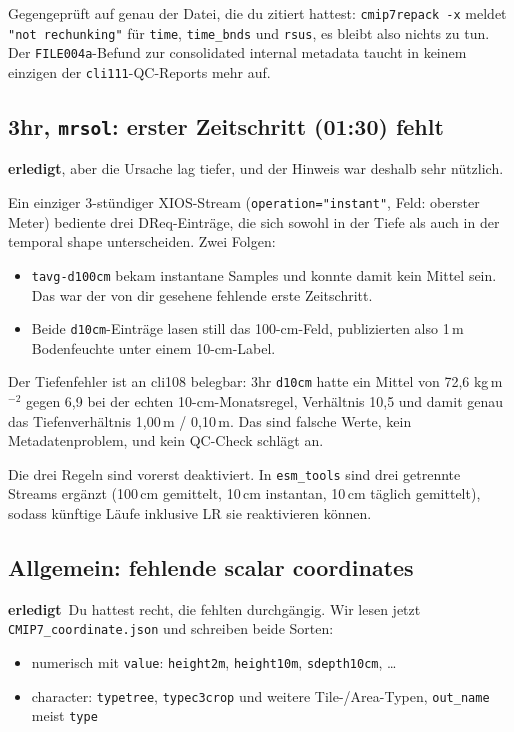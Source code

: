 \documentclass[11pt,a4paper]{article}
\newcommand{\code}[1]{\texttt{\small #1}}
\newcommand{\ok}{\textcolor{green!45!black}{\textbf{erledigt}}}
\begin{document}
Gegengepr\"uft auf genau der Datei, die du zitiert hattest:
\code{cmip7repack -x} meldet \code{"not rechunking"} f\"ur \code{time},
\code{time\_bnds} und \code{rsus}, es bleibt also nichts zu tun. Der
\code{FILE004a}-Befund zur consolidated internal metadata taucht in keinem
einzigen der \code{cli111}-QC-Reports mehr auf.

\subsection*{3hr, \code{mrsol}: erster Zeitschritt (01:30) fehlt}
\ok, aber die Ursache lag tiefer, und der Hinweis war deshalb sehr n\"utzlich.

Ein einziger 3-st\"undiger XIOS-Stream (\code{operation="instant"}, Feld: oberster
Meter) bediente drei DReq-Eintr\"age, die sich sowohl in der Tiefe als auch in der
temporal shape unterscheiden. Zwei Folgen:

\begin{itemize}
\item \code{tavg-d100cm} bekam instantane Samples und konnte damit kein Mittel sein.
      Das war der von dir gesehene fehlende erste Zeitschritt.
\item Beide \code{d10cm}-Eintr\"age lasen still das 100-cm-Feld, publizierten also
      1\,m Bodenfeuchte unter einem 10-cm-Label.
\end{itemize}

Der Tiefenfehler ist an cli108 belegbar: 3hr \code{d10cm} hatte ein Mittel von
72{,}6 kg\,m$^{-2}$ gegen 6{,}9 bei der echten 10-cm-Monatsregel, Verh\"altnis
10{,}5 und damit genau das Tiefenverh\"altnis 1{,}00\,m / 0{,}10\,m. Das sind falsche
Werte, kein Metadatenproblem, und kein QC-Check schl\"agt an.

Die drei Regeln sind vorerst deaktiviert. In \code{esm\_tools} sind drei getrennte
Streams erg\"anzt (100\,cm gemittelt, 10\,cm instantan, 10\,cm t\"aglich gemittelt),
sodass k\"unftige L\"aufe inklusive LR sie reaktivieren k\"onnen.

\subsection*{Allgemein: fehlende scalar coordinates}
\ok\ Du hattest recht, die fehlten durchg\"angig. Wir lesen jetzt
\code{CMIP7\_coordinate.json} und schreiben beide Sorten:

\begin{itemize}
\item numerisch mit \code{value}: \code{height2m}, \code{height10m}, \code{sdepth10cm}, \dots
\item character: \code{typetree}, \code{typec3crop} und weitere Tile-/Area-Typen,
      \code{out\_name} meist \code{type}
\end{itemize}
\end{document}
